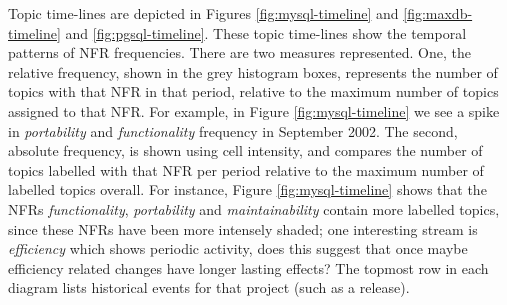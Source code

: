 \documentclass[smallextended]{svjour3}       %
\begin{document}
Topic time-lines are depicted in Figures \ref{fig:mysql-timeline} and
\ref{fig:maxdb-timeline} and \ref{fig:pgsql-timeline}. These topic time-lines show the
temporal patterns of NFR frequencies.
There are two measures represented. 
One, the relative frequency, shown in the grey histogram boxes, represents the number of topics with that NFR in that period, 
relative to the maximum number of topics assigned to that NFR. 
For example, in Figure \ref{fig:mysql-timeline} we see a spike in \emph{portability} and \emph{functionality} frequency in September 2002.
The second, absolute frequency, is shown using cell intensity, and compares the number of topics labelled with that NFR per period 
relative to the maximum number of labelled topics overall. 
For instance, Figure \ref{fig:mysql-timeline} shows that the NFRs
\emph{functionality}, \emph{portability} and \emph{maintainability}
contain more labelled topics, since these NFRs have been more
intensely shaded; 
one interesting stream is \emph{efficiency} which shows periodic
activity, does this suggest that once maybe efficiency related changes
have longer lasting effects?
The topmost row in each diagram lists historical events for that project (such as a release). 
\end{document}
